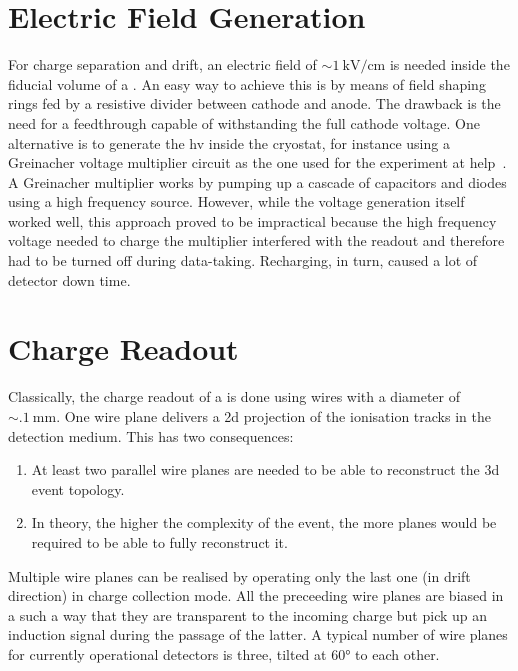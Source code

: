 \section{Electric Field Generation}
\label{sec:lartpc_efield}

For charge separation and drift, an electric field of $\sim{\SI{1}{\kilo\volt\per\centi\metre}}$ is needed inside the fiducial volume of a \lartpc{}.
An easy way to achieve this is by means of field shaping rings fed by a resistive divider between cathode and anode.
The drawback is the need for a feedthrough capable of withstanding the full cathode voltage.
One alternative is to generate the \gls{hv} inside the cryostat, for instance using a Greinacher voltage multiplier circuit as the one used for the \AT{} experiment at \gls{help}~\cite{AT}.
A Greinacher multiplier works by pumping up a cascade of capacitors and diodes using a high frequency source.
However, while the voltage generation itself worked well, this approach proved to be impractical because the high frequency voltage needed to charge the multiplier interfered with the readout and therefore had to be turned off during data-taking.
Recharging, in turn, caused a lot of detector down time.


\section{Charge Readout}
\label{sec:lartpc_charge-ro}

Classically, the charge readout of a \lartpc{} is done using wires with a diameter of $\sim{\SI{.1}{\milli\metre}}$.
One wire plane delivers a \gls{2d} projection of the ionisation tracks in the detection medium.
This has two consequences:
\begin{enumerate}
	\item At least two parallel wire planes are needed to be able to reconstruct the \gls{3d} event topology.
	\item In theory, the higher the complexity of the event, the more planes would be required to be able to fully reconstruct it.
\end{enumerate}
Multiple wire planes can be realised by operating only the last one (in drift direction) in charge collection mode.
All the preceeding wire planes are biased in a such a way that they are transparent to the incoming charge but pick up an induction signal during the passage of the latter.
A typical number of wire planes for currently operational detectors is three, tilted at \ang{60} to each other.


